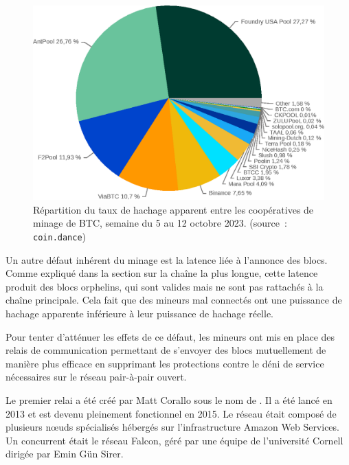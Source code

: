 
\begin{figure}[h]
  \centering
  \includegraphics[scale=0.75]{img/hashrate-distribution-coin-dance-week-20231012.eps}
  \caption{Répartition du taux de hachage apparent entre les coopératives de minage de BTC, semaine du 5 au 12 octobre 2023. (source~: \texttt{coin.dance})}
  \label{fig:hashrate-distribution}
\end{figure}


Un autre défaut inhérent du minage est la latence liée à l'annonce des blocs. Comme expliqué dans la section sur la chaîne la plus longue, cette latence produit des blocs orphelins, qui sont valides mais ne sont pas rattachés à la chaîne principale. Cela fait que des mineurs mal connectés ont une puissance de hachage apparente inférieure à leur puissance de hachage réelle.

Pour tenter d'atténuer les effets de ce défaut, les mineurs ont mis en place des relais de communication permettant de s'envoyer des blocs mutuellement de manière plus efficace en supprimant les protections contre le déni de service nécessaires sur le réseau pair-à-pair ouvert.

Le premier relai a été créé par Matt Corallo sous le nom de . Il a été lancé en 2013 et est devenu pleinement fonctionnel en 2015. Le réseau était composé de plusieurs nœuds spécialisés hébergés sur l'infrastructure Amazon Web Services. Un concurrent était le réseau Falcon, géré par une équipe de l'université Cornell dirigée par Emin Gün Sirer.


